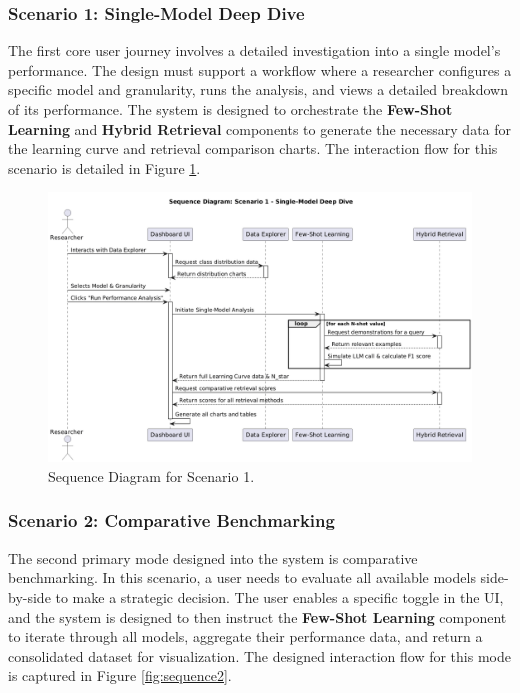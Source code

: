 \subsubsection{Scenario 1: Single-Model Deep Dive}
The first core user journey involves a detailed investigation into a single model's performance. The design must support a workflow where a researcher configures a specific model and granularity, runs the analysis, and views a detailed breakdown of its performance. The system is designed to orchestrate the \textbf{Few-Shot Learning} and \textbf{Hybrid Retrieval} components to generate the necessary data for the learning curve and retrieval comparison charts. The interaction flow for this scenario is detailed in Figure \ref{fig:sequence1}.

\begin{figure}[H]
    \centering
    \includegraphics[width=\textwidth]{Images/Sequence1.png}
    \caption{Sequence Diagram for Scenario 1.}
    \label{fig:sequence1}
\end{figure}


\subsubsection{Scenario 2: Comparative Benchmarking}
The second primary mode designed into the system is comparative benchmarking. In this scenario, a user needs to evaluate all available models side-by-side to make a strategic decision. The user enables a specific toggle in the UI, and the system is designed to then instruct the \textbf{Few-Shot Learning} component to iterate through all models, aggregate their performance data, and return a consolidated dataset for visualization. The designed interaction flow for this mode is captured in Figure \ref{fig:sequence2}.

